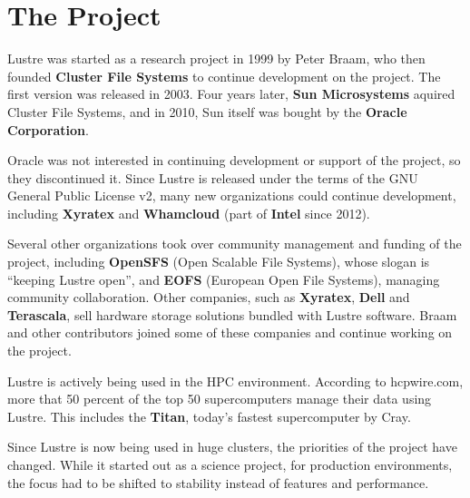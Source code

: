 \section{The Project}

Lustre was started as a research project in 1999 by Peter Braam, who then
founded \textbf{Cluster File Systems} to continue development on the
project. The first version was released in 2003. Four years later,
\textbf{Sun Microsystems} aquired Cluster File Systems, and in 2010, Sun
itself was bought by the \textbf{Oracle Corporation}.

Oracle was not interested in continuing development or support of the
project, so they discontinued it. Since Lustre is released under the terms
of the GNU General Public License v2, many new organizations could continue
development, including \textbf{Xyratex} and \textbf{Whamcloud} (part of
\textbf{Intel} since 2012).

Several other organizations took over community management and funding of
the project, including \textbf{OpenSFS} (Open Scalable File Systems), whose
slogan is ``keeping Lustre open'', and \textbf{EOFS} (European Open File
Systems), managing community collaboration. Other companies, such as
\textbf{Xyratex}, \textbf{Dell} and \textbf{Terascala}, sell hardware
storage solutions bundled with Lustre software. Braam and other contributors
joined some of these companies and continue working on the project.

Lustre is actively being used in the HPC environment. According to
hcpwire.com, more that 50 percent of the top 50 supercomputers manage their
data using Lustre. This includes the \textbf{Titan}, today's fastest
supercomputer by Cray.

Since Lustre is now being used in huge clusters, the priorities of the project
have changed. While it started out as a science project, for production
environments, the focus had to be shifted to stability instead of features and
performance.

\hspace{2cm}

